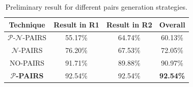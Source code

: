 \begin{table}[t]
	\caption{Preliminary result for different pairs generation strategies.}
	\label{tab:preliminary_resuts}
	\begin{center}
		\begin{tabular}[t]{|c||c|c|c|}
			
			\hline
			\textbf{Technique} & \textbf{Result in R1} & \textbf{Result in R2} & \textbf{Overall} \\ %
			\hline
			$\mathcal{P}$-$\mathcal{N}$-PAIRS      				& 55.17\%    &   64.74\% 	&   60.13\%   	\\
			$\mathcal{N}$-PAIRS       			& 76.20\%    &   67.53\% 	&   72.05\%     \\
			NO-PAIRS     				& 91.71\%    &   89.88\%	&   90.97\%    	\\
			$\boldsymbol{\mathcal{P}}$\textbf{-PAIRS}       	& 92.54\%    &   92.54\%	&   \textbf{92.54\%}    	\\
			\hline
		\end{tabular}
	\end{center}
\end{table}
